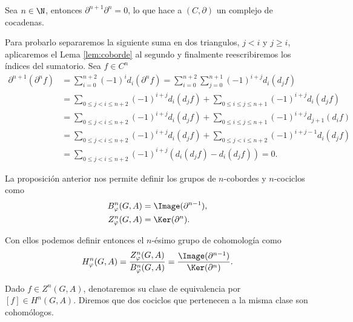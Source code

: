 \begin{teorema}\label{prop:cochaincomplex}
	Sea $n\in \N$, entonces $\partial^{n+1}\partial^n = 0$, lo que hace a
	$(C,\partial)$ un complejo de cocadenas.
	\begin{demostracion}
		
		Para probarlo separaremos la siguiente suma en dos triangulos,  $j<i$ y $j\geq i$, aplicaremos el Lema \ref{lem:coborde} al segundo y finalmente reescribiremos los índices del sumatorio. 
		Sea $f\in C^n$ %
		\begin{align*}
		\partial^{n+1}(\partial^{n} f) 
			&= \sum_{i=0}^{n+2} (-1)^i d_i(\partial^n f) = \sum_{i=0}^{n+2}\sum_{j=0}^{n+1} (-1)^{i+j} d_i(d_jf)\\
			&= \sum_{0\leq j < i \leq n+2} (-1)^{i+j} d_i(d_jf)  + \sum_{0\leq i \leq j \leq n+1} (-1)^{i+j} d_i(d_jf)\\
			&= \sum_{0\leq j < i \leq n+2} (-1)^{i+j} d_i(d_jf)  + \sum_{0\leq i \leq j \leq n+1} (-1)^{i+j} d_{j+1}(d_if) \\
			&= \sum_{0\leq j < i \leq n+2} (-1)^{i+j} d_i(d_jf)  + \sum_{0\leq j < i \leq n+2} (-1)^{i+j-1} d_{i}(d_jf) \\
			&= \sum_{0\leq j < i \leq n+2} (-1)^{i+j}(d_i(d_jf)-d_i(d_jf)) = 0.
		\end{align*}
	\end{demostracion}
\end{teorema}

\begin{definicion}
	La proposición anterior nos permite definir los grupos de $n$-cobordes y $n$-cociclos como 
	\begin{align*}
		B^n_\varphi(G,A) &= \Image(\partial^{n-1}), \\
		Z^n_\varphi(G,A) &= \Ker(\partial^{n}).
	\end{align*}
	
	Con ellos podemos definir entonces el $n$-ésimo grupo de cohomología como 
	\begin{equation}
		H^n_\varphi(G,A) = \frac{Z^n_\varphi(G,A)}{B^n_\varphi(G,A)} = \frac{\Image(\partial^{n-1})}{\Ker(\partial^{n})}.
	\end{equation}
	
	Dado $f\in Z^n(G,A)$, denotaremos su clase de equivalencia por $[f]\in H^n(G,A)$. Diremos que dos cociclos que pertenecen a la misma clase son cohomólogos. 
\end{definicion}

